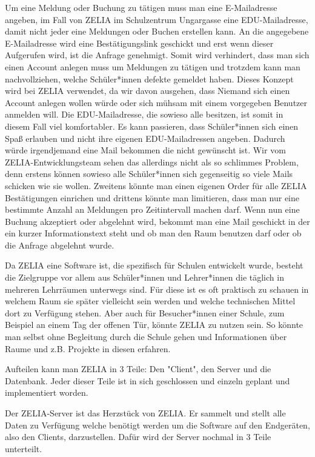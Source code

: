 Um eine Meldung oder Buchung zu tätigen muss man eine E-Mailadresse angeben, im Fall von ZELIA im Schulzentrum Ungargasse eine EDU-Mailadresse, damit nicht jeder eine Meldungen oder Buchen erstellen kann. An die angegebene E-Mailadresse wird eine Bestätigungslink geschickt und erst wenn dieser Aufgerufen wird, ist die Anfrage genehmigt. Somit wird verhindert, dass man sich einen Account anlegen muss um Meldungen zu tätigen und trotzdem kann man nachvollziehen, welche Schüler*innen defekte gemeldet haben. Dieses Konzept wird bei ZELIA verwendet, da wir davon ausgehen, dass Niemand sich einen Account anlegen wollen würde oder sich mühsam mit einem vorgegeben Benutzer anmelden will. Die EDU-Mailadresse, die sowieso alle besitzen, ist somit in diesem Fall viel komfortabler. Es kann passieren, dass Schüler*innen sich einen Spaß erlauben und nicht ihre eigenen EDU-Mailadressen angeben. Dadurch würde irgendjemand eine Mail bekommen die nicht gewünscht ist. Wir vom ZELIA-Entwicklungsteam sehen das allerdings nicht als so schlimmes Problem, denn erstens können sowieso alle Schüler*innen sich gegenseitig so viele Mails schicken wie sie wollen. Zweitens könnte man einen eigenen Order für alle ZELIA Bestätigungen einrichen und drittens könnte man limitieren, dass man nur eine bestimmte Anzahl an Meldungen pro Zeitintervall machen darf. Wenn nun eine Buchung akzeptiert oder abgelehnt wird, bekommt man eine Mail geschickt in der ein kurzer Informationstext steht und ob man den Raum benutzen darf oder ob die Anfrage abgelehnt wurde.

Da ZELIA eine Software ist, die spezifisch für Schulen entwickelt wurde, besteht die Zielgruppe vor allem aus Schüler*innen und Lehrer*innen die täglich in mehreren Lehrräumen unterwegs sind. Für diese ist es oft praktisch zu schauen in welchem Raum sie später vielleicht sein werden und welche technischen Mittel dort zu Verfügung stehen. Aber auch für Besucher*innen einer Schule, zum Beispiel an einem Tag der offenen Tür, könnte ZELIA zu nutzen sein. So könnte man selbst ohne Begleitung durch die Schule gehen und Informationen über Raume und z.B. Projekte in diesen erfahren.

Aufteilen kann man ZELIA in 3 Teile: Den "Client", den Server und die Datenbank. Jeder dieser Teile ist in sich geschlossen und einzeln geplant und implementiert worden.


Der ZELIA-Server ist das Herzstück von ZELIA. Er sammelt und stellt alle Daten zu Verfügung welche benötigt werden um die Software auf den Endgeräten, also den Clients, darzustellen. Dafür wird der Server nochmal in 3 Teile unterteilt.

